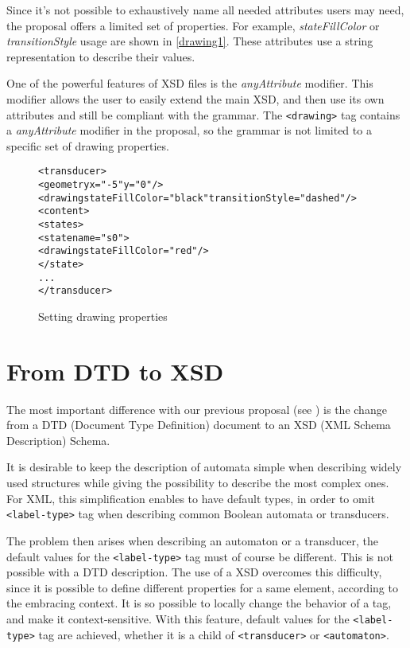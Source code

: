 \documentclass[a4paper]{article}
\def\typetag{\texttt{<label-type>}}
\def\drawingtag{\texttt{<drawing>}}
\def\automatontag{\texttt{<automaton>}}
\def\transducertag{\texttt{<transducer>}}
\begin{document}
Since it's not possible to exhaustively name all needed attributes
users may need, the proposal offers a limited set of properties. For
example, \textit{stateFillColor} or \textit{transitionStyle} usage are
shown in \autoref{drawing1}. These attributes use a string
representation to describe their values.

One of the powerful features of XSD files is the
\textit{anyAttribute} modifier. This modifier allows the user to easily
extend the main XSD, and then use its own attributes and still be
compliant with the grammar. The \drawingtag{} tag contains a
\textit{anyAttribute} modifier in the proposal, so the grammar is not
limited to a specific set of drawing properties.

{\small

\begin{figure}[h]
  \begin{center}
\begin{alltt}
<transducer>
  <geometry x="-5" y="0"/>
  <drawing stateFillColor="black" transitionStyle="dashed"/>
  <content>
     <states>
        <state name="s0">
            <drawing stateFillColor="red"/>
        </state>
      ...
</transducer>
\end{alltt}

\caption{Setting drawing properties}
\label{drawing1}
  \end{center}
\end{figure}
}

\section{From DTD to XSD}
The most important difference with our previous proposal (see \cite{VXML04}) is
the change from a DTD (Document Type Definition) document to an XSD (XML Schema
Description) Schema.

It is desirable to keep the description of automata simple when
describing widely used structures while giving the possibility to
describe the most complex ones. For XML, this simplification enables
to have default types, in order to omit \typetag{} tag when
describing common Boolean automata or transducers.

The problem then arises when describing an automaton or a transducer,
the default values for the \typetag{} tag must of course be
different. This is not possible with a DTD description.  The use of a
XSD overcomes this difficulty, since it is possible to define
different properties for a same element, according to the embracing
context. It is so possible to locally change the behavior of a tag, and
make it context-sensitive. With this feature, default values for the
\typetag{} tag are achieved, whether it is a child of
\transducertag{} or \automatontag{}.\\
\end{document}
